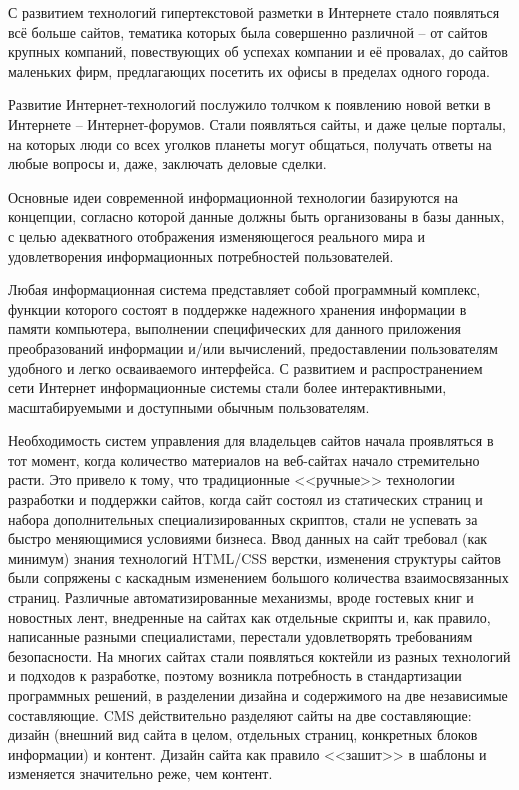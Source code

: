 С развитием технологий гипертекстовой разметки в Интернете стало появляться всё больше сайтов, тематика которых была совершенно различной -- от сайтов крупных компаний, повествующих об успехах компании и её провалах, до сайтов маленьких фирм, предлагающих посетить их офисы в пределах одного города.

Развитие Интернет-технологий послужило толчком к появлению новой ветки в Интернете -- Интернет-форумов. Стали появляться сайты, и даже целые порталы, на которых люди со всех уголков планеты могут общаться, получать ответы на любые вопросы и, даже, заключать деловые сделки.

Основные идеи современной информационной технологии базируются на концепции, согласно которой данные должны быть организованы в базы данных, с целью адекватного отображения изменяющегося реального мира и удовлетворения информационных потребностей пользователей.

Любая информационная система представляет собой программный комплекс, функции которого состоят в поддержке надежного хранения информации в памяти компьютера, выполнении специфических для данного приложения преобразований информации и/или вычислений, предоставлении пользователям удобного и легко осваиваемого интерфейса. С развитием и распространением сети Интернет информационные системы стали более интерактивными, масштабируемыми и доступными обычным пользователям.

Необходимость систем управления для владельцев сайтов начала проявляться в тот момент, когда количество материалов на веб-сайтах начало стремительно расти. Это привело к тому, что традиционные <<ручные>> технологии разработки и поддержки сайтов, когда сайт состоял из статических страниц и набора дополнительных специализированных скриптов, стали не успевать за быстро меняющимися условиями бизнеса. Ввод данных на сайт требовал (как минимум) знания технологий HTML/CSS верстки, изменения структуры сайтов были сопряжены с каскадным изменением большого количества взаимосвязанных страниц. Различные автоматизированные механизмы, вроде гостевых книг и новостных лент, внедренные на сайтах как отдельные скрипты и, как правило, написанные разными специалистами, перестали удовлетворять требованиям безопасности. На многих сайтах стали появляться коктейли из разных технологий и подходов к разработке, поэтому возникла потребность в стандартизации программных решений, в разделении дизайна и содержимого на две независимые составляющие. CMS действительно разделяют сайты на две составляющие: дизайн (внешний вид сайта в целом, отдельных страниц, конкретных блоков информации) и контент. Дизайн сайта как правило <<зашит>> в шаблоны и изменяется значительно реже, чем контент.

